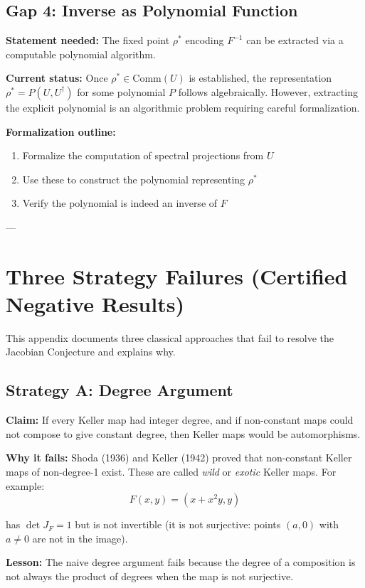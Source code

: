 \documentclass[11pt,a4paper]{article}
\theoremstyle{plain}
\theoremstyle{definition}
\newcommand{\Com}[1]{\mathrm{Comm}(#1)}
\begin{document}
\subsection{Gap 4: Inverse as Polynomial Function}

\textbf{Statement needed:} The fixed point $\rho^*$ encoding $F^{-1}$ can be extracted via a computable polynomial algorithm.

\textbf{Current status:} Once $\rho^* \in \Com{U}$ is established, the representation $\rho^* = P(U, U^\dagger)$ for some polynomial $P$ follows algebraically. However, extracting the explicit polynomial is an algorithmic problem requiring careful formalization.

\textbf{Formalization outline:}
\begin{enumerate}
\item Formalize the computation of spectral projections from $U$
\item Use these to construct the polynomial representing $\rho^*$
\item Verify the polynomial is indeed an inverse of $F$
\end{enumerate}

---

\section{Three Strategy Failures (Certified Negative Results)}
\label{app:strategy-failures}

This appendix documents three classical approaches that fail to resolve the Jacobian Conjecture and explains why.

\subsection{Strategy A: Degree Argument}

\textbf{Claim:} If every Keller map had integer degree, and if non-constant maps could not compose to give constant degree, then Keller maps would be automorphisms.

\textbf{Why it fails:} Shoda (1936) and Keller (1942) proved that non-constant Keller maps of non-degree-1 exist. These are called \textit{wild} or \textit{exotic} Keller maps. For example:
$$F(x, y) = (x + x^2 y, y)$$

has $\det J_F = 1$ but is not invertible (it is not surjective: points $(a, 0)$ with $a \neq 0$ are not in the image).

\textbf{Lesson:} The naive degree argument fails because the degree of a composition is not always the product of degrees when the map is not surjective.
\end{document}

